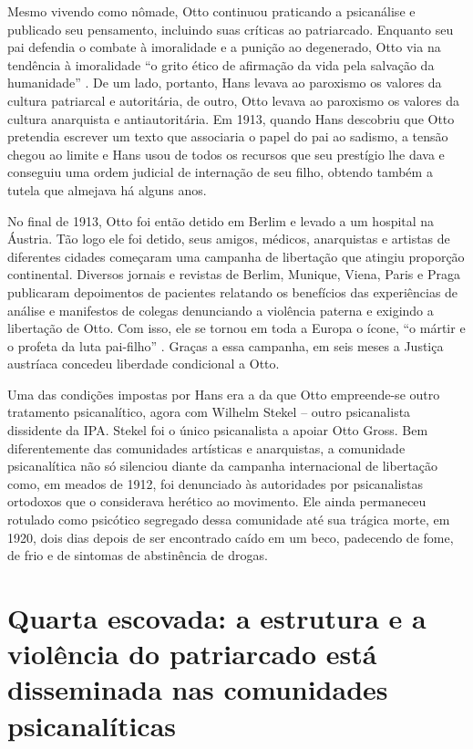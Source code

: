 Mesmo vivendo como nômade, Otto continuou praticando a psicanálise e
publicado seu pensamento, incluindo suas críticas ao patriarcado.
Enquanto seu pai defendia o combate à imoralidade e a punição ao
degenerado, Otto via na tendência à imoralidade ``o grito ético de
afirmação da vida pela salvação da humanidade'' . De um lado, portanto,
Hans levava ao paroxismo os valores da cultura patriarcal e autoritária,
de outro, Otto levava ao paroxismo os valores da cultura anarquista e
antiautoritária. Em 1913, quando Hans descobriu que Otto pretendia
escrever um texto que associaria o papel do pai ao sadismo, a tensão
chegou ao limite e Hans usou de todos os recursos que seu prestígio lhe
dava e conseguiu uma ordem judicial de internação de seu filho, obtendo
também a tutela que almejava há alguns anos.

No final de 1913, Otto foi então detido em Berlim e levado a um hospital
na Áustria. Tão logo ele foi detido, seus amigos, médicos, anarquistas e
artistas de diferentes cidades começaram uma campanha de libertação que
atingiu proporção continental. Diversos jornais e revistas de Berlim,
Munique, Viena, Paris e Praga publicaram depoimentos de pacientes
relatando os benefícios das experiências de análise e manifestos de
colegas denunciando a violência paterna e exigindo a libertação de Otto.
Com isso, ele se tornou em toda a Europa o ícone, ``o mártir e o profeta
da luta pai-filho'' . Graças a essa campanha, em seis meses a Justiça
austríaca concedeu liberdade condicional a Otto.

Uma das condições impostas por Hans era a da que Otto empreende-se outro
tratamento psicanalítico, agora com Wilhelm Stekel -- outro psicanalista
dissidente da IPA. Stekel foi o único psicanalista a apoiar Otto Gross.
Bem diferentemente das comunidades artísticas e anarquistas, a
comunidade psicanalítica não só silenciou diante da campanha
internacional de libertação como, em meados de 1912, foi denunciado às
autoridades por psicanalistas ortodoxos que o considerava herético ao
movimento. Ele ainda permaneceu rotulado como psicótico segregado dessa
comunidade até sua trágica morte, em 1920, dois dias depois de ser
encontrado caído em um beco, padecendo de fome, de frio e de sintomas de
abstinência de drogas.

\section{Quarta escovada: a estrutura e a violência do patriarcado está
disseminada nas comunidades psicanalíticas}


